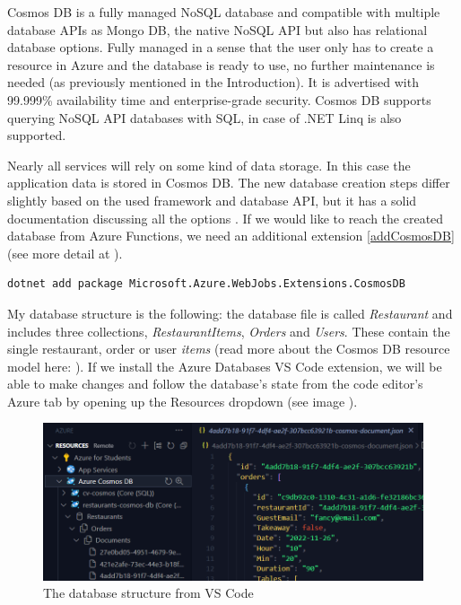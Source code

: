 Cosmos DB \cite{CosmosDBIntro} is a fully managed NoSQL database and compatible with multiple database APIs as Mongo DB, the native NoSQL API but also has relational database options. Fully managed in a sense that the user only has to create a resource in Azure and the database is ready to use, no further maintenance is needed (as previously mentioned in the Introduction). It is advertised with 99.999\% availability time and enterprise-grade security. Cosmos DB supports querying NoSQL API databases with SQL, in case of .NET Linq is also supported. 

Nearly all services will rely on some kind of data storage. In this case the application data is stored in Cosmos DB. The new database creation steps differ slightly based on the used framework and database API, but it has a solid documentation discussing all the options \cite{CosmosDBQuickstart}. If we would like to reach the created database from Azure Functions, we need an additional extension \ref{addCosmosDB} (see more detail at \cite{CosmosDBBinding}).

\lstset{ breaklines=true }
\begin{lstlisting}[frame=single,float=!ht, caption=Adding Cosmos DB to a Function App, label=addCosmosDB]
	dotnet add package Microsoft.Azure.WebJobs.Extensions.CosmosDB
\end{lstlisting}

My database structure is the following: the database file is called \emph{Restaurant} and includes three collections, \emph{RestaurantItems}, \emph{Orders} and \emph{Users}. These contain the single restaurant, order or user \emph{items} (read more about the Cosmos DB resource model here: \cite{CosmosDBResourceModel}). If we install the Azure Databases VS Code extension, we will be able to make changes and follow the database's state from the code editor's Azure tab by opening up the Resources dropdown (see image ). 
\begin{figure}[!ht]
	\centering
	\includegraphics[width=150mm, keepaspectratio]{figures/DB/CosmosStructure.png}
	\caption{The database structure from VS Code} 
	\label{fig:CosmosStructure}
\end{figure}


